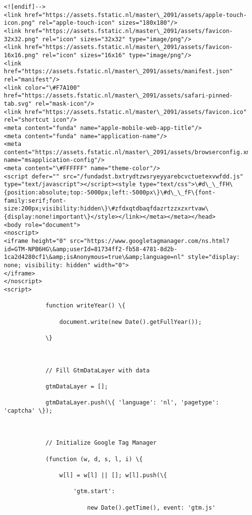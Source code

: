 \documentclass[11pt]{article}
\begin{document}
\begin{Verbatim}[commandchars=\\\{\}]
        <![endif]-->
<link href="https://assets.fstatic.nl/master\_2091/assets/apple-touch-icon.png" rel="apple-touch-icon" sizes="180x180"/>
<link href="https://assets.fstatic.nl/master\_2091/assets/favicon-32x32.png" rel="icon" sizes="32x32" type="image/png"/>
<link href="https://assets.fstatic.nl/master\_2091/assets/favicon-16x16.png" rel="icon" sizes="16x16" type="image/png"/>
<link href="https://assets.fstatic.nl/master\_2091/assets/manifest.json" rel="manifest"/>
<link color="\#F7A100" href="https://assets.fstatic.nl/master\_2091/assets/safari-pinned-tab.svg" rel="mask-icon"/>
<link href="https://assets.fstatic.nl/master\_2091/assets/favicon.ico" rel="shortcut icon"/>
<meta content="funda" name="apple-mobile-web-app-title"/>
<meta content="funda" name="application-name"/>
<meta content="https://assets.fstatic.nl/master\_2091/assets/browserconfig.xml" name="msapplication-config"/>
<meta content="\#FFFFFF" name="theme-color"/>
<script defer="" src="/fundadst.bxtrydtzwsryeyyarebcvctuetexvwfdd.js" type="text/javascript"></script><style type="text/css">\#d\_\_fFH\{position:absolute;top:-5000px;left:-5000px\}\#d\_\_fF\{font-family:serif;font-size:200px;visibility:hidden\}\#zfdxqtdbaqfdazrtzzxzxrtvaw\{display:none!important\}</style></link></meta></meta></head>
<body role="document">
<noscript>
<iframe height="0" src="https://www.googletagmanager.com/ns.html?id=GTM-NPB6HG\&amp;userId=81734ff2-fb58-4781-8d2b-1ca2d4280cf1\&amp;isAnonymous=true\&amp;language=nl" style="display: none; visibility: hidden" width="0">
</iframe>
</noscript>
<script>

            function writeYear() \{

                document.write(new Date().getFullYear());

            \}



            // Fill GtmDataLayer with data

            gtmDataLayer = [];

            gtmDataLayer.push(\{ 'language': 'nl', 'pagetype': 'captcha' \});



            // Initialize Google Tag Manager

            (function (w, d, s, l, i) \{

                w[l] = w[l] || []; w[l].push(\{

                    'gtm.start':

                        new Date().getTime(), event: 'gtm.js'


\end{Verbatim}
\end{document}
